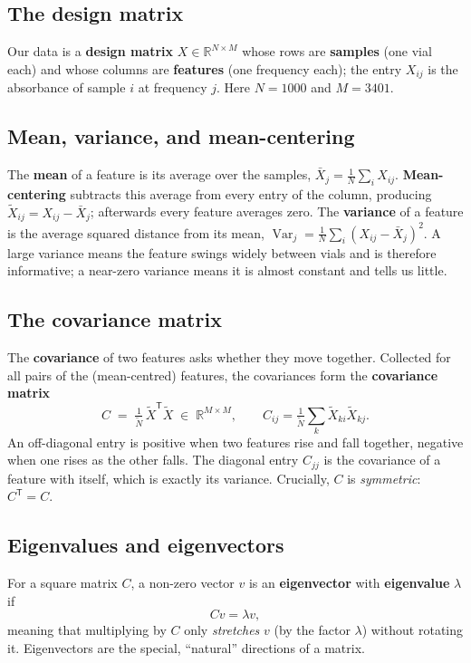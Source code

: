 \documentclass[11pt]{article}
\DeclareMathOperator{\Var}{Var}
\newcommand{\R}{\mathbb{R}}
\newcommand{\Xt}{\widetilde{X}}
\newcommand{\Nt}{\widetilde{N}}
\newcommand{\T}{^{\mathsf{T}}}
\theoremstyle{definition}\newtheorem{definition}{Definition}[section]
\theoremstyle{plain}\newtheorem{proposition}{Proposition}[section]
\theoremstyle{remark}\newtheorem{remark}{Remark}[section]
\begin{document}
\subsection{The design matrix}
Our data is a \textbf{design matrix} $X\in\R^{N\times M}$ whose rows are \textbf{samples}
(one vial each) and whose columns are \textbf{features} (one frequency each); the entry
$X_{ij}$ is the absorbance of sample $i$ at frequency $j$. Here $N=1000$ and $M=3401$.

\subsection{Mean, variance, and mean-centering}
The \textbf{mean} of a feature is its average over the samples,
$\bar X_j=\tfrac1N\sum_i X_{ij}$. \textbf{Mean-centering} subtracts this average from every
entry of the column, producing $\Xt_{ij}=X_{ij}-\bar X_j$; afterwards every feature averages
zero. The \textbf{variance} of a feature is the average squared distance from its mean,
$\Var_j=\tfrac1N\sum_i(X_{ij}-\bar X_j)^2$. A large variance means the feature swings widely
between vials and is therefore informative; a near-zero variance means it is almost constant
and tells us little.

\subsection{The covariance matrix}
The \textbf{covariance} of two features asks whether they move together. Collected for all
pairs of the (mean-centred) features, the covariances form the \textbf{covariance matrix}
\[
  C \;=\; \tfrac1{\Nt}\,\Xt\T\Xt \;\in\;\R^{M\times M}, \qquad
  C_{ij}=\tfrac1{\Nt}\sum_{k}\Xt_{ki}\Xt_{kj}.
\]
An off-diagonal entry is positive when two features rise and fall together, negative when one
rises as the other falls. The diagonal entry $C_{jj}$ is the covariance of a feature with
itself, which is exactly its variance. Crucially, $C$ is \emph{symmetric}: $C\T=C$.

\subsection{Eigenvalues and eigenvectors}
For a square matrix $C$, a non-zero vector $v$ is an \textbf{eigenvector} with
\textbf{eigenvalue} $\lambda$ if
\[
  Cv=\lambda v,
\]
meaning that multiplying by $C$ only \emph{stretches} $v$ (by the factor $\lambda$) without
rotating it. Eigenvectors are the special, ``natural'' directions of a matrix.
\end{document}
